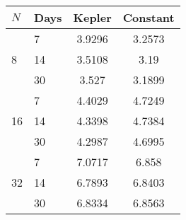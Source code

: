 \begin{tabular}{l|lcc}
\hline
$N$ & Days & Kepler & Constant \\
\hline
\multirow{3}{*}{8} & 7 & 3.9296 & 3.2573 \\ 
&14 & 3.5108 & 3.19 \\ 
&30 & 3.527 & 3.1899 \\ \hline
\multirow{3}{*}{16} & 7 & 4.4029 & 4.7249 \\ 
&14 & 4.3398 & 4.7384 \\ 
&30 & 4.2987 & 4.6995 \\ \hline
\multirow{3}{*}{32} & 7 & 7.0717 & 6.858 \\ 
&14 & 6.7893 & 6.8403 \\ 
&30 & 6.8334 & 6.8563 \\  \hline
\end{tabular}
                    